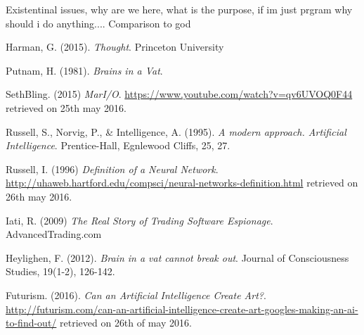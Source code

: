 \documentclass[a4paper]{article}
\begin{document}
Existentinal issues, why are we here, what is the purpose, if im just prgram why should i do anything....
Comparison to god

\begin{thebibliography}{9}

  Harman, G. (2015). \emph{Thought}. Princeton University 

  Putnam, H. (1981). \emph{Brains in a Vat}.
  
  SethBling. (2015) \emph{MarI/O}. \url{https://www.youtube.com/watch?v=qv6UVOQ0F44} retrieved on 25th may 2016.
  
Russell, S., Norvig, P., \& Intelligence, A. (1995). \emph{A modern approach. Artificial Intelligence}. Prentice-Hall, Egnlewood Cliffs, 25, 27.

Russell, I. (1996) \emph{Definition of a Neural Network}. \url{http://uhaweb.hartford.edu/compsci/neural-networks-definition.html} retrieved on 26th may 2016.

 Iati, R. (2009) \emph{The Real Story of Trading Software Espionage}. AdvancedTrading.com
 
 Heylighen, F. (2012). \emph{Brain in a vat cannot break out}. Journal of Consciousness Studies, 19(1-2), 126-142.
 
Futurism. (2016). \emph{Can an Artificial Intelligence Create Art?}. \url{http://futurism.com/can-an-artificial-intelligence-create-art-googles-making-an-ai-to-find-out/} retrieved on 26th of may 2016.


\end{thebibliography}
\end{document}
